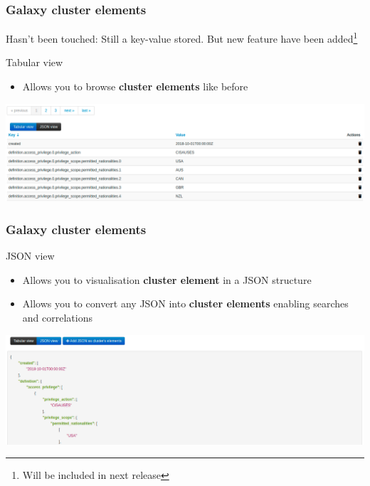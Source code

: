 \begin{frame}
    \frametitle{Galaxy cluster elements}
    Hasn't been touched: Still a key-value stored. But new feature have been added\footnote{Will be included in next release}
    \vspace{0.5em}

    Tabular view
    \begin{itemize}
        \item Allows you to browse {\bf cluster elements} like before
    \end{itemize}
    \begin{center}
        \includegraphics[width=1.0\linewidth]{pics/tabular-view.png}
    \end{center}
\end{frame}

\begin{frame}
    \frametitle{Galaxy cluster elements}
    JSON view
    \begin{itemize}
        \item Allows you to visualisation {\bf cluster element} in a JSON structure
        \item Allows you to convert any JSON into {\bf cluster elements} enabling searches and correlations
    \end{itemize}
    \begin{center}
        \includegraphics[width=1.0\linewidth]{pics/json-view.png}
    \end{center}
\end{frame}

